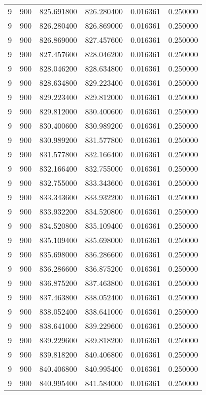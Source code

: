 \begin{longtable}{rrrrrr}
9 & 900 & 825.691800 & 826.280400 & 0.016361 & 0.250000 \\
9 & 900 & 826.280400 & 826.869000 & 0.016361 & 0.250000 \\
9 & 900 & 826.869000 & 827.457600 & 0.016361 & 0.250000 \\
9 & 900 & 827.457600 & 828.046200 & 0.016361 & 0.250000 \\
9 & 900 & 828.046200 & 828.634800 & 0.016361 & 0.250000 \\
9 & 900 & 828.634800 & 829.223400 & 0.016361 & 0.250000 \\
9 & 900 & 829.223400 & 829.812000 & 0.016361 & 0.250000 \\
9 & 900 & 829.812000 & 830.400600 & 0.016361 & 0.250000 \\
9 & 900 & 830.400600 & 830.989200 & 0.016361 & 0.250000 \\
9 & 900 & 830.989200 & 831.577800 & 0.016361 & 0.250000 \\
9 & 900 & 831.577800 & 832.166400 & 0.016361 & 0.250000 \\
9 & 900 & 832.166400 & 832.755000 & 0.016361 & 0.250000 \\
9 & 900 & 832.755000 & 833.343600 & 0.016361 & 0.250000 \\
9 & 900 & 833.343600 & 833.932200 & 0.016361 & 0.250000 \\
9 & 900 & 833.932200 & 834.520800 & 0.016361 & 0.250000 \\
9 & 900 & 834.520800 & 835.109400 & 0.016361 & 0.250000 \\
9 & 900 & 835.109400 & 835.698000 & 0.016361 & 0.250000 \\
9 & 900 & 835.698000 & 836.286600 & 0.016361 & 0.250000 \\
9 & 900 & 836.286600 & 836.875200 & 0.016361 & 0.250000 \\
9 & 900 & 836.875200 & 837.463800 & 0.016361 & 0.250000 \\
9 & 900 & 837.463800 & 838.052400 & 0.016361 & 0.250000 \\
9 & 900 & 838.052400 & 838.641000 & 0.016361 & 0.250000 \\
9 & 900 & 838.641000 & 839.229600 & 0.016361 & 0.250000 \\
9 & 900 & 839.229600 & 839.818200 & 0.016361 & 0.250000 \\
9 & 900 & 839.818200 & 840.406800 & 0.016361 & 0.250000 \\
9 & 900 & 840.406800 & 840.995400 & 0.016361 & 0.250000 \\
9 & 900 & 840.995400 & 841.584000 & 0.016361 & 0.250000 \\

\end{longtable}
